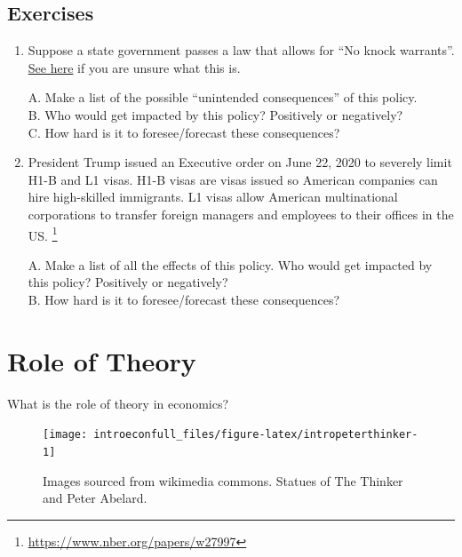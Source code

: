 \documentclass[
]{book}
\begin{document}
\hypertarget{exercises}{%
\subsection{Exercises}\label{exercises}}

\begin{enumerate}
\def\labelenumi{\arabic{enumi}.}
\item
  Suppose a state government passes a law that allows for ``No knock warrants''. \href{https://en.wikipedia.org/wiki/No-knock_warrant\#:~:text=In\%20the\%20United\%20States\%2C\%20a,knocking\%20or\%20ringing\%20a\%20doorbell}{See here} if you are unsure what this is.

  A. Make a list of the possible ``unintended consequences'' of this policy.\\
  B. Who would get impacted by this policy? Positively or negatively?\\
  C. How hard is it to foresee/forecast these consequences?
\item
  President Trump issued an Executive order on June 22, 2020 to severely limit H1-B and L1 visas. H1-B visas are visas issued so American companies can hire high-skilled immigrants. L1 visas allow American multinational corporations to transfer foreign managers and employees to their offices in the US. \footnote{\url{https://www.nber.org/papers/w27997}}

  A. Make a list of all the effects of this policy. Who would get impacted by this policy? Positively or negatively?\\
  B. How hard is it to foresee/forecast these consequences?
\end{enumerate}

\hypertarget{role-of-theory}{%
\section{Role of Theory}\label{role-of-theory}}

What is the role of theory in economics?

\begin{figure}

{\centering \texttt{[image: introeconfull\_files/figure-latex/intropeterthinker-1]} 

}

\caption{Images sourced from wikimedia commons. Statues of The Thinker and Peter Abelard.}\label{fig:intropeterthinker}
\end{figure}
\end{document}
